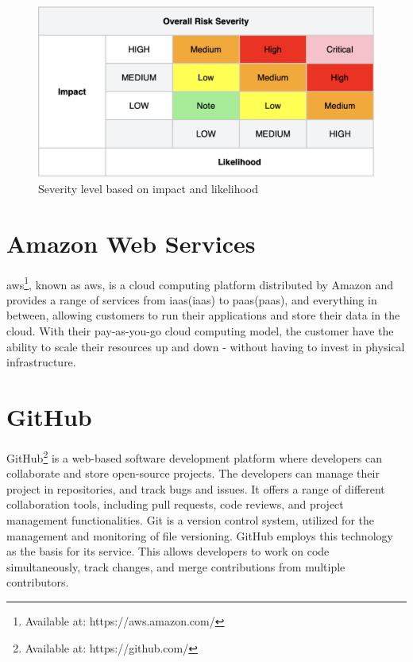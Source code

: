 \begin{figure}[H]
    \centering
    \includegraphics[scale=0.4]{Images/OWASP-severity.png}
    \caption{Severity level based on impact and likelihood}
    \label{fig:OWASP Severity Scale}
\end{figure}
\newpage




\section{Amazon Web Services}
\acrlong{aws}\footnote{Available at: https://aws.amazon.com/}, known as \acrshort{aws}, is a cloud computing platform distributed by Amazon and provides a range of services from \acrlong{iaas}(\acrshort{iaas}) to \acrlong{paas}(\acrshort{paas}), and everything in between, allowing customers to run their applications and store their data in the cloud. With their pay-as-you-go cloud computing model, the customer have the ability to scale their resources up and down - without having to invest in physical infrastructure.\cite{aws}  

\section{GitHub}
GitHub\footnote{Available at: https://github.com/} is a web-based software development platform where developers can collaborate and store open-source projects. The developers can manage their project in repositories, and track bugs and issues. It offers a range of different collaboration tools, including pull requests, code reviews, and project management functionalities. Git is a version control system, utilized for the management and monitoring of file versioning. GitHub employs this technology as the basis for its service. This allows developers to work on code simultaneously, track changes, and merge contributions from multiple contributors.\cite{github}
